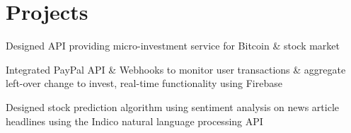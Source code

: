 ﻿\documentclass[letterpaper]{deedy-resume} %
\begin{document}
\begin{minipage}[t]{0.66\textwidth}
\begin{tightitemize}
        \end{tightitemize}






        \section{Projects}


        \begin{tightitemize}
                \item Designed API providing micro-investment service for Bitcoin \& stock market
                \item Integrated PayPal API \& Webhooks to monitor user transactions \& aggregate left-over change to invest, real-time functionality using Firebase
                \item Designed stock prediction algorithm using sentiment analysis on news article headlines using the Indico natural language processing API
        \end{tightitemize}

        \sectionspace %




\end{minipage}
\end{document}
